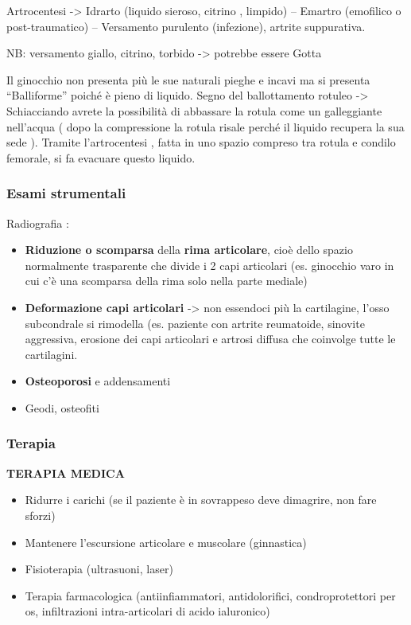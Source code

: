 Artrocentesi -> Idrarto (liquido sieroso, citrino , limpido) -- Emartro (emofilico o post-traumatico) -- Versamento purulento (infezione), artrite suppurativa.

NB: versamento giallo, citrino, torbido -> potrebbe essere Gotta

Il ginocchio non presenta più le sue naturali pieghe e incavi ma si presenta ``Balliforme'' poiché è pieno di liquido. Segno del ballottamento rotuleo -> Schiacciando avrete la possibilità di abbassare la rotula come un galleggiante nell'acqua ( dopo la compressione la rotula risale perché il liquido recupera la sua sede ). Tramite l'artrocentesi , fatta in uno spazio compreso tra rotula e condilo
femorale, si fa evacuare questo liquido.

\subsubsection{Esami strumentali }

Radiografia :

\begin{itemize}
\item
  \textbf{Riduzione o scomparsa} della \textbf{rima articolare}, cioè dello spazio normalmente trasparente che divide i 2 capi articolari (es. ginocchio varo in cui c'è una scomparsa della rima solo nella parte mediale)
\item
  \textbf{Deformazione capi articolari} -> non essendoci più la cartilagine, l'osso subcondrale si rimodella (es. paziente con artrite reumatoide, sinovite aggressiva, erosione dei capi articolari e artrosi diffusa che coinvolge tutte le cartilagini.
\item
  \textbf{Osteoporosi} e addensamenti
\item
  Geodi, osteofiti
\end{itemize}

\subsubsection{Terapia}

\textbf{TERAPIA MEDICA }

\begin{itemize}
\item
  Ridurre i carichi (se il paziente è in sovrappeso deve dimagrire, non fare sforzi)
\item
  Mantenere l'escursione articolare e muscolare (ginnastica)
\item
  Fisioterapia (ultrasuoni, laser)
\item
  Terapia farmacologica (antiinfiammatori, antidolorifici, condroprotettori per os, infiltrazioni intra-articolari di acido ialuronico)
\end{itemize}

